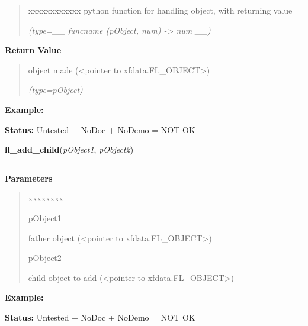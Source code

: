 \begin{boxedminipage}{\funcwidth}
\begin{quote}
\begin{Ventry}{xxxxxxxxxxxx}
          python function for handling object, with returning value

            {\it (type=\_\_ funcname (pObject, num) -{\textgreater} num \_\_)}

        \end{Ventry}

      \end{quote}

      \textbf{Return Value}
    \vspace{-1ex}

      \begin{quote}
      object made ({\textless}pointer to xfdata.FL\_OBJECT{\textgreater})

      {\it (type=pObject)}

      \end{quote}

\textbf{Example:} 

\textbf{Status:} Untested + NoDoc + NoDemo = NOT OK



    \end{boxedminipage}

    \label{xformslib:library:fl_add_child}

    \vspace{0.5ex}

\hspace{.8\funcindent}\begin{boxedminipage}{\funcwidth}

    \raggedright \textbf{fl\_add\_child}(\textit{pObject1}, \textit{pObject2})

    \vspace{-1.5ex}

    \rule{\textwidth}{0.5\fboxrule}
\setlength{\parskip}{2ex}
\setlength{\parskip}{1ex}
      \textbf{Parameters}
      \vspace{-1ex}

      \begin{quote}
        \begin{Ventry}{xxxxxxxx}

          \item[pObject1]

          father object ({\textless}pointer to 
          xfdata.FL\_OBJECT{\textgreater})

          \item[pObject2]

          child object to add ({\textless}pointer to 
          xfdata.FL\_OBJECT{\textgreater})

        \end{Ventry}

      \end{quote}

\textbf{Example:} 

\textbf{Status:} Untested + NoDoc + NoDemo = NOT OK



    \end{boxedminipage}

